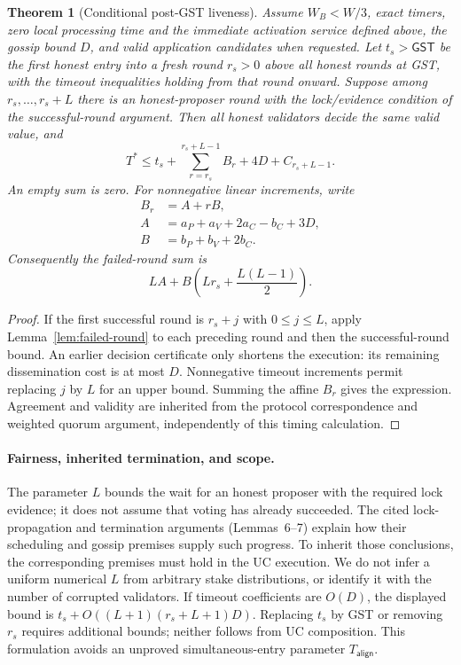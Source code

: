 \documentclass[conference,letterpaper,10pt]{IEEEtran}
\newtheorem{theorem}{Theorem}
\begin{document}
\begin{theorem}[Conditional post-GST liveness]\label{thm:conditional-liveness}
Assume $W_B<W/3$, exact timers, zero local processing time and the immediate activation service defined above, the gossip bound $D$, and valid application candidates when requested. Let $t_s>\mathsf{GST}$ be the first honest entry into a fresh round $r_s>0$ above all honest rounds at GST, with the timeout inequalities holding from that round onward. Suppose among $r_s,\ldots,r_s+L$ there is an honest-proposer round with the lock/evidence condition of the successful-round argument. Then all honest validators decide the same valid value, and
\[
 T^*\leq t_s+\sum_{r=r_s}^{r_s+L-1}B_r
                 +4D+C_{r_s+L-1}.
\]
An empty sum is zero. For nonnegative linear increments, write
\[
 \begin{aligned}
 B_r&=A+rB,\\
 A&=a_P+a_V+2a_C-b_C+3D,\\
 B&=b_P+b_V+2b_C.
 \end{aligned}
\]
Consequently the failed-round sum is
\[
 LA+B\left(Lr_s+\frac{L(L-1)}2\right).
\]
\end{theorem}
\begin{proof}
If the first successful round is $r_s+j$ with $0\leq j\leq L$, apply Lemma~\ref{lem:failed-round} to each preceding round and then the successful-round bound. An earlier decision certificate only shortens the execution: its remaining dissemination cost is at most $D$. Nonnegative timeout increments permit replacing $j$ by $L$ for an upper bound. Summing the affine $B_r$ gives the expression. Agreement and validity are inherited from the protocol correspondence and weighted quorum argument, independently of this timing calculation.
\end{proof}

\paragraph{Fairness, inherited termination, and scope.}
The parameter $L$ bounds the wait for an honest proposer with the required lock evidence; it does not assume that voting has already succeeded. The cited lock-propagation and termination arguments (Lemmas~6--7) explain how their scheduling and gossip premises supply such progress. To inherit those conclusions, the corresponding premises must hold in the UC execution. We do not infer a uniform numerical $L$ from arbitrary stake distributions, or identify it with the number of corrupted validators. If timeout coefficients are $O(D)$, the displayed bound is $t_s+O((L+1)(r_s+L+1)D)$. Replacing $t_s$ by GST or removing $r_s$ requires additional bounds; neither follows from UC composition. This formulation avoids an unproved simultaneous-entry parameter $T_{\mathsf{align}}$.
\end{document}
